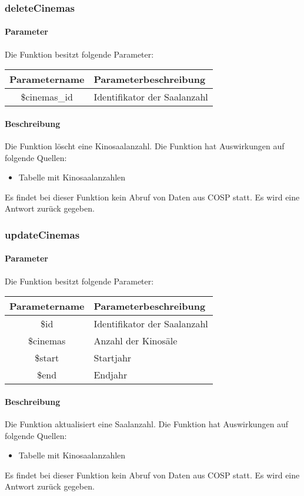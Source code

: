 \subsubsection{deleteCinemas}
\paragraph{Parameter} Die Funktion besitzt folgende Parameter:
\begin{table}[H]
	\begin{tabular}{|c|p{11cm}|}
		\hline
		\textbf{Parametername} & \textbf{Parameterbeschreibung} \\ \hline
		\$cinemas\_id & Identifikator der Saalanzahl \\ \hline
	\end{tabular}
\end{table}
\paragraph{Beschreibung} Die Funktion löscht eine Kinosaalanzahl. Die Funktion hat Auswirkungen auf folgende Quellen:
\begin{itemize}
	\item Tabelle mit Kinosaalanzahlen
\end{itemize}
Es findet bei dieser Funktion kein Abruf von Daten aus {\glqq COSP\grqq} statt. Es wird eine Antwort zurück gegeben.
\subsubsection{updateCinemas}
\paragraph{Parameter} Die Funktion besitzt folgende Parameter:
\begin{table}[H]
	\begin{tabular}{|c|p{11cm}|}
		\hline
		\textbf{Parametername} & \textbf{Parameterbeschreibung} \\ \hline
		\$id      & Identifikator der Saalanzahl \\ \hline
		\$cinemas & Anzahl der Kinosäle \\ \hline
		\$start   & Startjahr \\ \hline
		\$end     & Endjahr \\ \hline
	\end{tabular}
\end{table}
\paragraph{Beschreibung} Die Funktion aktualisiert eine Saalanzahl. Die Funktion hat Auswirkungen auf folgende Quellen:
\begin{itemize}
	\item Tabelle mit Kinosaalanzahlen
\end{itemize}
Es findet bei dieser Funktion kein Abruf von Daten aus {\glqq COSP\grqq} statt. Es wird eine Antwort zurück gegeben.
